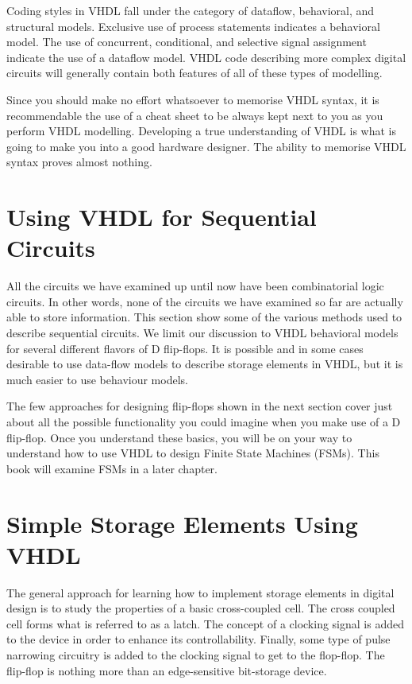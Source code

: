 Coding styles in VHDL fall under the category of dataflow, behavioral, and structural models. Exclusive use of process statements indicates a behavioral model. The use of concurrent, conditional, and selective signal assignment indicate the use of a dataflow model. VHDL code describing more complex digital circuits will generally contain both features of all of these types of modelling. 

Since you should make no effort whatsoever to memorise VHDL syntax, it is recommendable the use of a cheat sheet to be always kept next to you as you perform VHDL modelling. Developing a true understanding of VHDL is what is going to make you into a good hardware designer. The ability to memorise VHDL syntax proves almost nothing. 

\section{Using VHDL for Sequential Circuits}
All the circuits we have examined up until now have been combinatorial logic circuits. In other words, none of the circuits we have examined so far are actually able to store information. This section show some of the various methods used to describe sequential circuits. We limit our discussion to VHDL behavioral models for several different flavors of D flip-flops. It is possible and in some cases desirable to use data-flow models to describe storage elements in VHDL, but it is much easier to use behaviour models.   

The few approaches for designing flip-flops shown in the next section cover just about all the possible functionality you could imagine when you make use of a D flip-flop. Once you understand these basics, you will be on your way to understand how to use VHDL to design Finite State Machines (FSMs). This book will examine FSMs in a later chapter.

\section{Simple Storage Elements Using VHDL}
The general approach for learning how to implement storage elements in digital design is to study the properties of a basic cross-coupled cell. The cross coupled cell forms what is referred to as a latch. The concept of a clocking signal is added to the device in order to enhance its controllability. Finally, some type of pulse narrowing circuitry is added to the clocking signal to get to the flop-flop. The flip-flop is nothing more than an edge-sensitive bit-storage device.

